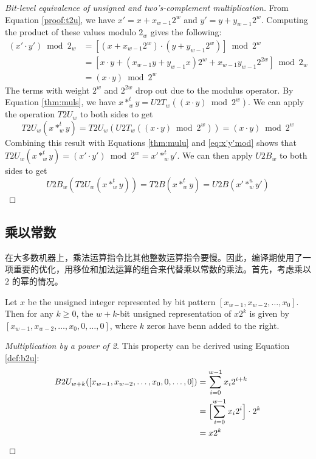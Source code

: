 \begin{proof}[Bit-level equivalence of unsigned and two's-complement multiplication]
    From Equation \eqref{proof:t2u}, we have $x' = x + x_{w-1}2^w$ and $y' = y + y_{w-1}2^w$. Computing the product of these values modulo $2_w$ gives the following:
    \begin{equation}
        \begin{aligned}
            (x' \cdot y') \bmod 2_w & = [(x + x_{w-1}2^w) \cdot (y + y_{w-1}2^w)] \bmod 2^w \\
            & = [x \cdot y + (x_{w-1}y + y_{w-1}x)2^w + x_{w-1}y_{w-1}2^{2w}] \bmod 2_w \\
            &= (x \cdot y) \bmod 2^w
        \end{aligned}
        \label{eq:x'y'mod}
    \end{equation}
    The terms with weight $2^w$ and $2^{2w}$ drop out due to the modulus operator. By Equation \eqref{thm:muls}, we have $x *^t_w y = U2T_w((x \cdot y) \bmod 2^w)$. We can apply the operation $T2U_w$ to both sides to get
    \[
        T2U_w(x *^t_w y) = T2U_w(U2T_w((x \cdot y) \bmod 2^w)) = (x \cdot y) \bmod 2^w
    \]
    Combining this result with Equations \eqref{thm:mulu} and \eqref{eq:x'y'mod} shows that $T2U_w(x *^t_w y) = (x' \cdot y') \bmod 2^w = x' *^t_w y'$. We can then apply $U2B_w$ to both sides to get
    \[
        U2B_w(T2U_w(x *^t_w y)) = T2B(x *^t_w y) = U2B(x' *^u_w y')
    \]
\end{proof}

\subsection{乘以常数}

在大多数机器上，乘法运算指令比其他整数运算指令要慢。因此，编译期使用了一项重要的优化，用移位和加法运算的组合来代替乘以常数的乘法。首先，考虑乘以 $2$ 的幂的情况。

\begin{theorem}
    Let $x$ be the unsigned integer represented by bit pattern $[x_{w-1}, x_{w-2}, \dots, x_0]$. Then for any $k \geq 0$, the $w + k$-bit unsigned representation of $x2^k$ is given by $[x_{w-1}, x_{w-2}, \dots, x_0, 0, \dots, 0]$, where $k$ zeros have benn added to the right.
\end{theorem}

\begin{proof}[Multiplication by a power of 2]
    This property can be derived using Equation \eqref{def:b2u}:
    \begin{align*}
        B2U_{w+k}([x_{w-1}, x_{w-2}, \dots, x_0, 0, \dots, 0]) &= \sum\limits_{i=0}^{w-1}x_i2^{i+k} \\
        & = \Bigl[\sum\limits_{i=0}^{w-1}x_i2^i\Bigr] \cdot 2^k \\
        &= x2^k
    \end{align*}
\end{proof}

